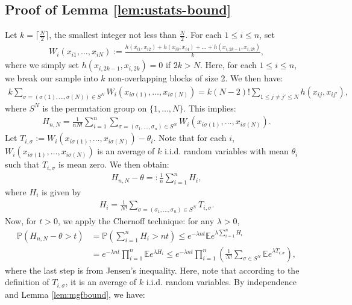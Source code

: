 \documentclass[preprint,11pt]{article}
\newcommand{\mbb}{\mathbb}
\numberwithin{equation}{section}
\begin{document}
\subsection{Proof of Lemma \ref{lem:ustats-bound}}
    Let $k=\lceil \frac{N}{2} \rceil$, the smallest integer not less than $\frac{N}{2}$. For each $1\le i\le n$, set
    \begin{align*}
        W_i(x_{i1},\ldots,x_{iN}):=\frac{h(x_{i1},x_{i2})+h(x_{i3},x_{i4})+\ldots+h(x_{i,2k-1},x_{i,2k})}{k},
    \end{align*}
    where we simply set $h(x_{i,2k-1},x_{i,2k})=0$ if $2k>N$. Here, for each $1\le i\le n$, we break our sample into $k$ non-overlapping blocks of size 2. We then have:
    \begin{align*}
        k\sum_{\sigma=(\sigma(1),\ldots,\sigma(N))\in S^N}W_i(x_{i\sigma(1)},\ldots,x_{i\sigma(N)})=k(N-2)!\sum_{1\le j\neq j'\le N}h(x_{ij},x_{ij'}),
    \end{align*}
    where $S^N$ is the permutation group on $\{1,\ldots,N\}$. This implies:
    \begin{align*}
        H_{n,N}=\frac{1}{nN!}\sum_{i=1}^{n}\sum_{\sigma=(\sigma_1,\ldots,\sigma_n)\in S^N}W_i(x_{i\sigma(1)},\ldots,x_{i\sigma(N)}).
    \end{align*}
    Let $T_{i,\sigma}:=W_i(x_{i\sigma(1)},\ldots,x_{i\sigma(N)})-\theta_i$. Note that for each $i$, $W_i(x_{i\sigma(1)},\ldots,x_{i\sigma(N)})$ is an average of $k$ i.i.d. random variables with mean $\theta_i$ such that $T_{i,\sigma}$ is mean zero. We then obtain:
    \begin{align*}
        H_{n,N}-\theta=:\frac{1}{n}\sum_{i=1}^{n}H_{i},
    \end{align*}
    where $H_i$ is given by
    \begin{align*}
        H_i=\frac{1}{N!}\sum_{\sigma=(\sigma_1,\ldots,\sigma_n)\in S^N}T_{i,\sigma}.
    \end{align*}
    Now, for $t>0$, we apply the Chernoff technique: for any $\lambda>0$,
    \begin{align}\label{chernoff}
        \mbb{P}(H_{n,N}-\theta>t)&=\mbb{P}\left(\sum_{i=1}^{n}H_i>nt\right)\le e^{-\lambda nt}\mbb{E}e^{\lambda\sum_{i=1}^{n}H_i}\nonumber\\
        &=e^{-\lambda nt}\prod_{i=1}^{n}\mbb{E}e^{\lambda H_i}\le e^{-\lambda nt}\prod_{i=1}^{n}\left(\frac{1}{N!}\sum_{\sigma\in S^N}\mbb{E}e^{\lambda T_{i,\sigma}}\right),
    \end{align}
    where the last step is from Jensen's inequality. Here, note that according to the definition of $T_{i,\sigma}$, it is an average of $k$ i.i.d. random variables. By independence and Lemma \ref{lem:mgfbound}, we have:
\end{document}
